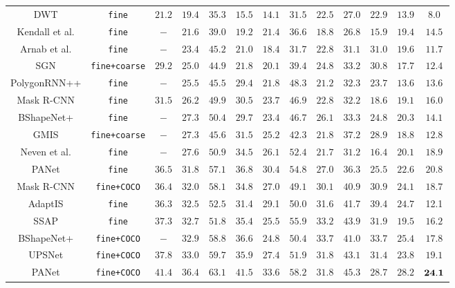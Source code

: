 \documentclass[10pt,twocolumn,letterpaper]{article}
\begin{document}
\begin{table*}[t!]
\begin{tabular}{|c|c|c|cc|cccccccc|}
  DWT \cite{bai2017deep}  & \texttt{fine} &$21.2$ &$19.4$ &$35.3$ &$15.5$ &$14.1$ &$31.5$ &$22.5$ &$27.0$ &$22.9$ &$13.9$ &$8.0$ \\
  Kendall et al. \cite{Kendall_2018_CVPR}  & \texttt{fine} &$-$ &$21.6$ &$39.0	$ &$19.2$ &$21.4$ &$36.6$ &$18.8$ &$26.8$ &$15.9$ &$19.4$ &$14.5$ \\
  Arnab et al. \cite{ArnabT17}  & \texttt{fine}  &$-$ &$23.4$ &$45.2$ &$21.0$ &$18.4$ &$31.7$ &$22.8$ &$31.1$ &$31.0$ &$19.6$ &$11.7$\\
  SGN \cite{liu2017sgn}  & \texttt{fine+coarse} &$29.2$ &$25.0$ &$44.9$ 
    &$21.8$ &$20.1$ &$39.4$ &$24.8$ &$33.2$ &$30.8$ &$17.7$ &$12.4$ \\
  PolygonRNN++ \cite{polygon-rnn++}  & \texttt{fine} &$-$ &$25.5$ &$45.5$ &$29.4$ &$21.8$ &$48.3$ &$21.2$ &$32.3$ &$23.7$ &$13.6$ &$13.6$ \\
  Mask R-CNN \cite{mask-rcnn} & \texttt{fine} &$31.5$ &$26.2$ &$49.9$ &$30.5$ &$23.7$ &$46.9$ &$22.8$ &$32.2$ &$18.6$ &$19.1$ &$16.0$ \\
  BShapeNet+ \cite{bshapenet} & \texttt{fine} & $-$ &$27.3$ &$50.4$
    &$29.7$ &$23.4$ &$46.7$ &$26.1$ &$33.3$ &$24.8$ &$20.3$ &$14.1$ \\
  GMIS  \cite{Liu2018AffinityDA}  & \texttt{fine+coarse} &$-$  & $27.3$ &$ 45.6$ &$31.5 $ &$25.2$ &$ 42.3 $ &$21.8$ &$ 37.2$ &$ 28.9$ &$18.8$ &$ 12.8$ \\
  Neven et al.  \cite{Neven_2019_CVPR}  & \texttt{fine} &$-$  & $27.6$ &$ 50.9$ &$34.5$ &$26.1$ &$ 52.4$ &$ 21.7$ &$ 31.2$ &$ 16.4$ &$ 20.1$ &$ 18.9$ \\
  PANet  \cite{panet}  & \texttt{fine} & $36.5$ &$31.8$ &$57.1$ &$36.8$ &$30.4$ &$54.8$ &$27.0$ &$36.3$ &$25.5$ &$22.6$ &$20.8$ \\


  Mask R-CNN \cite{mask-rcnn}  & \texttt{fine+COCO} &$36.4$ &$32.0$ &$58.1$ &$34.8$ &$27.0$ &$49.1$ &$30.1$ &$40.9$ &$30.9$ &$24.1$ &$18.7$ \\
   AdaptIS  \cite{Sofiiuk2019AdaptISAI}  & \texttt{fine} & $36.3$ &$32.5$ &$52.5$ & 31.4 &29.1 &50.0 &31.6 &41.7&39.4 &$24.7$ &12.1 \\
  SSAP \cite{Gao_2019_ICCV}  & \texttt{fine} &$37.3$ &$32.7$ &$51.8$ 
    &$35.4$ &$25.5$ &$55.9$ &$ 33.2$ &$43.9$ &$31.9$ &$19.5$ &$16.2$ \\
  BShapeNet+ \cite{bshapenet} & \texttt{fine+COCO} & $-$ &$32.9$ &$58.8$ 
    &$36.6$ &$24.8$ &$50.4$ &$33.7$ &$41.0$ &$33.7$ &$25.4$ &$17.8$ \\
UPSNet \cite{upsnet} & \texttt{fine+COCO} &$37.8$ &$33.0$ &$59.7$ &$35.9$ &$27.4$ &$51.9$ &$31.8$ &$43.1$ &$31.4$ &$23.8$ &$19.1$ \\
  PANet \cite{panet} & \texttt{fine+COCO} &$41.4$ &$36.4$ &$63.1$ 
    &$41.5$ &$33.6$ &$58.2$ &$31.8$ &$45.3$ &$28.7$ &$28.2$ &$\bf{24.1}$ \\
 

\end{tabular}
\end{table*}
\end{document}
